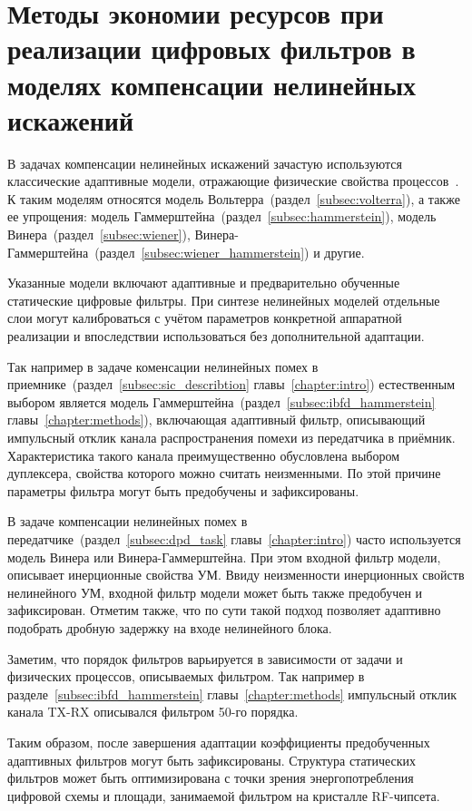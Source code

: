 \section{Методы экономии ресурсов при реализации цифровых фильтров в моделях компенсации нелинейных искажений}

В задачах компенсации нелинейных искажений зачастую используются классические адаптивные модели, отражающие физические свойства процессов~\cite{dpd_thesis}. К таким моделям относятся модель Вольтерра~(раздел~\ref{subsec:volterra}), а также ее упрощения: модель Гаммерштейна~(раздел~\ref{subsec:hammerstein}), модель Винера~(раздел~\ref{subsec:wiener}), Винера-Гаммерштейна~(раздел~\ref{subsec:wiener_hammerstein}) и другие. 

Указанные модели включают адаптивные и предварительно обученные статические цифровые фильтры. При синтезе нелинейных моделей отдельные слои могут калиброваться с учётом параметров конкретной аппаратной реализации и впоследствии использоваться без дополнительной адаптации. 

Так например в задаче коменсации нелинейных помех в приемнике~(раздел~\ref{subsec:sic_describtion} главы~\ref{chapter:intro}) естественным выбором является модель Гаммерштейна~(раздел~\ref{subsec:ibfd_hammerstein} главы~\ref{chapter:methods}), включающая адаптивный фильтр, описывающий импульсный отклик канала распространения помехи из передатчика в приёмник. Характеристика такого канала преимущественно обусловлена выбором дуплексера, свойства которого можно считать неизменными. По этой причине параметры фильтра могут быть предобучены и зафиксированы.
 
В задаче компенсации нелинейных помех в передатчике~(раздел~\ref{subsec:dpd_task} главы~\ref{chapter:intro}) часто используется модель Винера или Винера-Гаммерштейна. При этом входной фильтр модели, описывает инерционные свойства УМ. Ввиду неизменности инерционных свойств нелинейного УМ, входной фильтр модели может быть также предобучен и зафиксирован. Отметим также, что по сути такой подход позволяет адаптивно подобрать дробную задержку на входе нелинейного блока.

Заметим, что порядок фильтров варьируется в зависимости от задачи и физических процессов, описываемых фильтром. Так например в разделе~\ref{subsec:ibfd_hammerstein} главы~\ref{chapter:methods} импульсный отклик канала TX-RX описывался фильтром 50-го порядка. 

Таким образом, после завершения адаптации коэффициенты предобученных адаптивных фильтров могут быть зафиксированы. Структура статических фильтров может быть оптимизирована с точки зрения энергопотребления цифровой схемы и площади, занимаемой фильтром на кристалле RF-чипсета.

